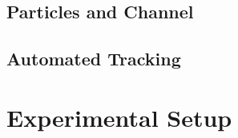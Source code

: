 \documentclass[]{report}
\begin{document}
\subsection{Particles and Channel}




\subsection{Automated Tracking}
     

\section{Experimental Setup}




%
%
%
%
%

	
\end{document}
